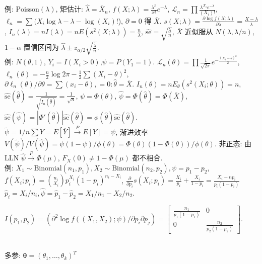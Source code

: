 \documentclass[a4paper, landscape,10pt]{article}
\begin{document}
\begin{multicols}{4}
例: $\mathrm{Poisson}(\lambda)$, 矩估计: $\hat \lambda = \overline X_n$,
$f(X; \lambda) = \frac{\lambda^x}{x!} e^{-\lambda}$,
$\mathcal{L}_n = \prod \frac{\lambda^{X_i}e^{-\lambda}}{(X_i)!}$, $\ell_n = \sum (X_i \log \lambda - \lambda - \log (X_i)!$), $\partial = 0$ 得 $\overline X$.
$s(X; \lambda) = \frac{\partial \log f(X; \lambda)}{\partial \lambda} = \frac{X - \lambda}{\lambda}$,
$I_n(\lambda) = n I(\lambda) = n E(s^2(X; \lambda)) = \frac{n}{\lambda}$, $\hat {\mathrm{se}} = \sqrt{\frac{\lambda}{n}}$, 
$\overline X$ 近似服从 $N(\lambda, \lambda / n)$,
$1 - \alpha$ 置信区间为 $\hat \lambda \pm z_{\alpha/2} \sqrt{\frac {\hat \lambda} {n}}$. \\
例: $N(\theta, 1)$, $Y_i = I(X_i > 0)$,$\psi = P(Y_1 = 1)$.
$\mathcal{L}_n(\theta) = \prod \frac{1}{\sqrt{2\pi}} e^{-\frac{(X_i - \theta)^2}{2}}$,
$\ell_n(\theta) = -\frac{n}{2} \log 2\pi - \frac{1}{2} \sum (X_i - \theta)^2$,
$\partial \ell_n(\theta) / \partial \theta = \sum (x_i - \theta), = 0 : \hat \theta = \overline X$.
$I_n(\theta) = n E_\theta(s^2(X_i; \theta)) = n$,
$\hat{\mathrm{se}}(\hat \theta) = \frac{1}{\sqrt{I_n(\hat \theta)}} = \frac{1}{\sqrt{n}}$,
$\psi = \Phi(\theta)$, $\hat \psi = \Phi(\hat \theta) = \Phi(\overline X)$,
$\hat{\mathrm{se}}(\hat \psi) = |\Phi'(\hat \theta)| \hat{\mathrm{se}}(\hat \theta) = \phi(\hat \theta) \hat{\mathrm{se}}(\hat \theta)$.\\
$\tilde \psi = 1/n \sum Y = E[\overline Y] \xrightarrow{P} E[Y] = \psi$, 渐进效率 $V(\tilde \psi) / V(\hat \psi) = \psi (1 - \psi) / \phi(\theta) = \Phi(\theta) (1 - \Phi(\theta)) / \phi(\theta)$. 
非正态: 由 LLN $\hat \psi \xrightarrow{P} \Phi(\mu)$, $F_X(0) \neq 1 - \Phi(\mu)$ 都不相合. \\
例: $X_1 \sim \mathrm{Binomial}(n_1, p_1), X_2 \sim \mathrm{Binomial}(n_2, p_2), \psi = p_1 - p_2$,
$f(X_i; p_i) = \binom{n_i}{X_i} p_i^{X_i} (1 - p_i)^{n_i - X_i}$,
$\frac {\partial} {\partial p_i} s(X_i; p_i) = \frac {X_i} {p_i} + \frac {X_i} {1 - p_i} = \frac {X_i - n p_i } {p_i (1 - p_i)}$
$\hat p_i = X_i / n_i, \hat \psi = \hat p_1 - \hat p_2 = X_1/n_1 - X_2 / n_2$.
\begin{tiny}
$I(p_1, p_2) = (\partial ^ 2 \log f((X_1, X_2); \psi) / \partial p_i \partial p_j) = \begin{bmatrix}
	\frac{n_1}{p_1(1 - p_1)} & 0\\
	0 & \frac{n_2}{p_2(1 - p_2)}
	\end{bmatrix}. $
\end{tiny} \\
多参: $\mathbf{\theta} = (\theta_1, \dots, \theta_k)^T$ 

\end{multicols}
\end{document}
